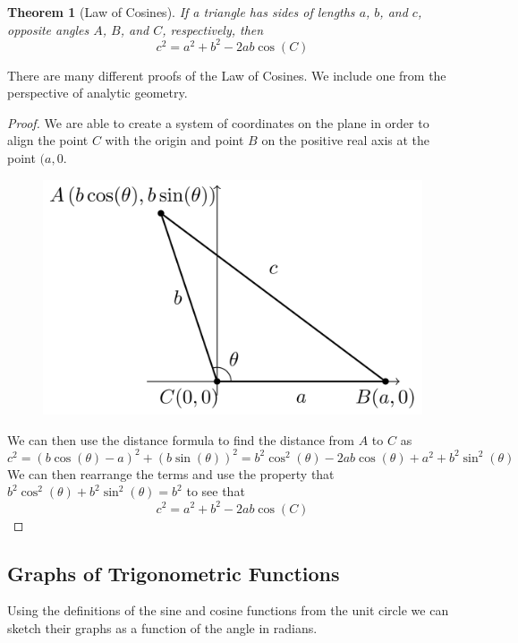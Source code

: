 \documentclass[
]{book}
\newtheorem{theorem}{Theorem}[chapter]
\theoremstyle{definition}
\theoremstyle{definition}
\theoremstyle{definition}
\theoremstyle{remark}
\begin{document}
\begin{theorem}[Law of Cosines]
\protect\hypertarget{thm:unnamed-chunk-243}{}{\label{thm:unnamed-chunk-243} {} }If a triangle has sides of lengths \(a\), \(b\), and \(c\), opposite angles \(A\), \(B\), and \(C\), respectively, then
\[c^2=a^2+b^2 -2ab\cos(C)\]
\end{theorem}

There are many different proofs of the Law of Cosines. We include one from the perspective of analytic geometry.

\begin{proof}

We are able to create a system of coordinates on the plane in order to align the point \(C\) with the origin and point \(B\) on the positive real axis at the point \((a,0\).

\begin{figure}

{\centering \includegraphics[width=0.4\linewidth]{tikz/law-of-cosines} 

}

\end{figure}

We can then use the distance formula to find the distance from \(A\) to \(C\) as
\[c^2=\left(b\cos(\theta)-a\right)^2 + (b\sin(\theta))^2= b^2 \cos^2(\theta)-2ab\cos(\theta) + a^2 + b^2 \sin^2(\theta)\]
We can then rearrange the terms and use the property that \(b^2\cos^2(\theta) + b^2\sin^2(\theta) = b^2\) to see that
\[c^2=a^2+b^2 -2ab\cos(C)\]

\end{proof}

\hypertarget{graphs-of-trigonometric-functions}{%
\subsection{Graphs of Trigonometric Functions}\label{graphs-of-trigonometric-functions}}

Using the definitions of the sine and cosine functions from the unit circle we can sketch their graphs as a function of the angle in radians.
\end{document}
